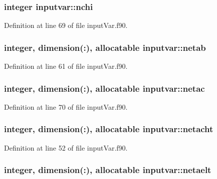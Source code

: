 \hypertarget{classinputvar_ac34eff504af528e971c7174dfcb39028}{
\subsubsection[{nchi}]{\setlength{\rightskip}{0pt plus 5cm}integer inputvar\-::nchi}}\label{classinputvar_ac34eff504af528e971c7174dfcb39028}


Definition at line 69 of file input\-Var.\-f90.

\hypertarget{classinputvar_af109996c7b379bac5d6c3d89c5b6df1d}{
\subsubsection[{netab}]{\setlength{\rightskip}{0pt plus 5cm}integer, dimension(\-:), allocatable inputvar\-::netab}}\label{classinputvar_af109996c7b379bac5d6c3d89c5b6df1d}


Definition at line 61 of file input\-Var.\-f90.

\hypertarget{classinputvar_ad9998f4f97f100bf6294fb8fa083bfe7}{
\subsubsection[{netac}]{\setlength{\rightskip}{0pt plus 5cm}integer, dimension(\-:), allocatable inputvar\-::netac}}\label{classinputvar_ad9998f4f97f100bf6294fb8fa083bfe7}


Definition at line 70 of file input\-Var.\-f90.

\hypertarget{classinputvar_a7f82eda09f512dfe2f28f82efc5187ad}{
\subsubsection[{netacht}]{\setlength{\rightskip}{0pt plus 5cm}integer, dimension(\-:), allocatable inputvar\-::netacht}}\label{classinputvar_a7f82eda09f512dfe2f28f82efc5187ad}


Definition at line 52 of file input\-Var.\-f90.

\hypertarget{classinputvar_a2bfcb389a7fba156b8c1146150a71f51}{
\subsubsection[{netaelt}]{\setlength{\rightskip}{0pt plus 5cm}integer, dimension(\-:), allocatable inputvar\-::netaelt}}\label{classinputvar_a2bfcb389a7fba156b8c1146150a71f51}


